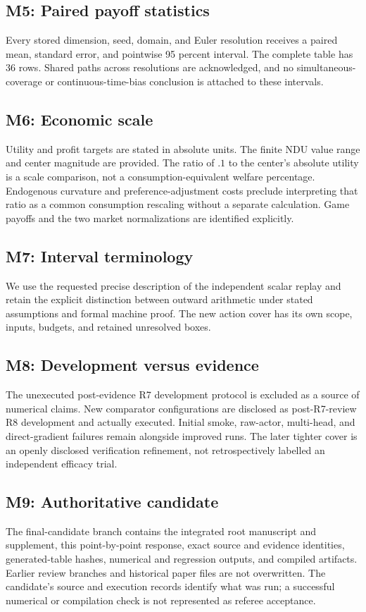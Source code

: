 \subsection{M5: Paired payoff statistics}
Every stored dimension, seed, domain, and Euler resolution receives a paired mean, standard error, and pointwise 95 percent interval. The complete table has 36 rows. Shared paths across resolutions are acknowledged, and no simultaneous-coverage or continuous-time-bias conclusion is attached to these intervals.

\subsection{M6: Economic scale}
Utility and profit targets are stated in absolute units. The finite NDU value range and center magnitude are provided. The ratio of $.1$ to the center's absolute utility is a scale comparison, not a consumption-equivalent welfare percentage. Endogenous curvature and preference-adjustment costs preclude interpreting that ratio as a common consumption rescaling without a separate calculation. Game payoffs and the two market normalizations are identified explicitly.

\subsection{M7: Interval terminology}
We use the requested precise description of the independent scalar replay and retain the explicit distinction between outward arithmetic under stated assumptions and formal machine proof. The new action cover has its own scope, inputs, budgets, and retained unresolved boxes.

\subsection{M8: Development versus evidence}
The unexecuted post-evidence R7 development protocol is excluded as a source of numerical claims. New comparator configurations are disclosed as post-R7-review R8 development and actually executed. Initial smoke, raw-actor, multi-head, and direct-gradient failures remain alongside improved runs. The later tighter cover is an openly disclosed verification refinement, not retrospectively labelled an independent efficacy trial.

\subsection{M9: Authoritative candidate}
The final-candidate branch contains the integrated root manuscript and supplement, this point-by-point response, exact source and evidence identities, generated-table hashes, numerical and regression outputs, and compiled artifacts. Earlier review branches and historical paper files are not overwritten. The candidate's source and execution records identify what was run; a successful numerical or compilation check is not represented as referee acceptance.
